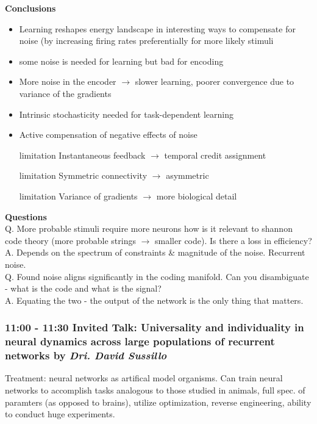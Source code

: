 \documentclass[12pt]{article}
\begin{document}
\textbf{Conclusions}
\begin{itemize}
    \item Learning reshapes energy landscape in interesting ways to compensate for noise (by increasing firing rates preferentially for more likely stimuli
    \item some noise is needed for learning but bad for encoding
    \item More noise in the encoder $\rightarrow$ slower learning, poorer convergence due to variance of the gradients 
    \item Intrinsic stochasticity needed for task-dependent learning
    \item Active compensation of negative effects of noise
    \item [limitation] Instantaneous feedback $\rightarrow$ temporal credit assignment
    \item [limitation] Symmetric connectivity $\rightarrow$ asymmetric
    \item [limitation] Variance of gradients $\rightarrow$ more biological detail
\end{itemize}

\textbf{Questions}  \\

Q. More probable stimuli require more neurons how is it relevant to shannon code theory (more probable strings $\rightarrow$ smaller code). Is there a loss in efficiency? \\ 

A. Depends on the spectrum of constraints \& magnitude of the noise. Recurrent noise. \\

Q. Found noise aligns significantly in the coding manifold. Can you disambiguate - what is the code and what is the signal? \\

A. Equating the two - the output of the network is the only thing that matters.


\subsubsection{11:00 - 11:30 Invited Talk: Universality and individuality in neural dynamics across large populations of recurrent networks by \textit{Dri. David Sussillo}}

Treatment: neural networks as artifical model organisms. Can train neural networks to accomplish tasks analogous to those studied in animals, full spec. of paramters (as opposed to brains), utilize optimization, reverse engineering, ability to conduct huge experiments. \\
\end{document}
